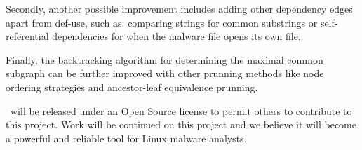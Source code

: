 Secondly, another possible improvement includes adding other dependency edges apart from def-use, such as: comparing strings for common substrings or self-referential dependencies for when the malware file opens its own file.

Finally, the backtracking algorithm for determining the maximal common subgraph can be further improved with other prunning methods like node ordering strategies and ancestor-leaf equivalence prunning.

\textbf{\project}\ will be released under an Open Source license to permit others to contribute to this project. Work will be continued on this project and we believe it will become a powerful and reliable tool for Linux malware analysts.